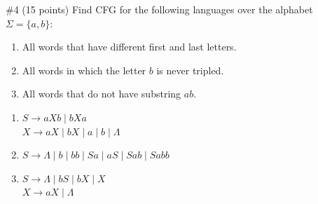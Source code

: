 \begin{problem}{\#4 (15 points)}
    Find CFG for the following languages over the alphabet $\Sigma = \{a,b\}$:
    \begin{enumerate}[label=\alph*)]
        \item All words that have different first and last letters.
        \item All words in which the letter $b$ is never tripled.
        \item All words that do not have substring $ab$.
    \end{enumerate}
\end{problem}
\begin{solution}
    \begin{enumerate}[label=\alph*)]
        \item $S \to aXb \mid bXa$\\
        $X \to aX \mid bX \mid a \mid b \mid \Lambda$
        \item $S \to \Lambda \mid b \mid bb \mid Sa \mid aS \mid Sab \mid Sabb$
        \item $S \to \Lambda \mid bS \mid bX \mid X$\\
        $X \to aX \mid \Lambda$
    \end{enumerate}
\end{solution}

